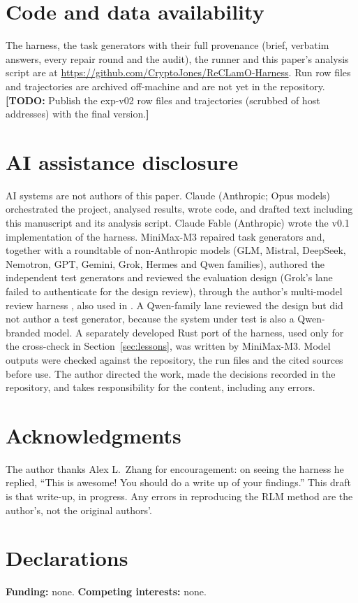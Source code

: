 \documentclass[11pt]{article}
\newcommand{\TODO}[1]{\textcolor{red!70!black}{\textbf{[TODO:} #1\textbf{]}}}
\begin{document}
\section*{Code and data availability}
The harness, the task generators with their full provenance (brief, verbatim
answers, every repair round and the audit), the runner and this paper's analysis
script are at \url{https://github.com/CryptoJones/ReCLamO-Harness}. Run row files and
trajectories are archived off-machine and are not yet in the repository.
\TODO{Publish the exp-v02 row files and trajectories (scrubbed of host addresses)
with the final version.}

\section*{AI assistance disclosure}
\label{sec:disclosure}
AI systems are not authors of this paper. Claude (Anthropic; Opus models)
orchestrated the project, analysed results, wrote code, and drafted text including
this manuscript and its analysis script. Claude Fable (Anthropic) wrote the v0.1
implementation of the harness. MiniMax-M3 repaired task generators and, together
with a roundtable of non-Anthropic models (GLM, Mistral, DeepSeek, Nemotron, GPT,
Gemini, Grok, Hermes and Qwen families), authored the independent test generators and
reviewed the evaluation design (Grok's lane failed to authenticate for the design
review), through the author's multi-model review harness
\citep{flatline}, also used in \citet{clark2026veto}. A Qwen-family lane reviewed the
design but did not author a test generator, because the system under test is also a Qwen-branded model. A separately developed Rust port of the harness, used only for the
cross-check in Section~\ref{sec:lessons}, was written by MiniMax-M3. Model outputs were checked against the repository, the run files and the cited
sources before use. The author directed the work, made the decisions recorded in the
repository, and takes responsibility for the content, including any errors.

\section*{Acknowledgments}
The author thanks Alex L.\ Zhang for encouragement: on seeing the harness he replied,
``This is awesome! You should do a write up of your findings.'' This draft is that
write-up, in progress. Any errors in reproducing the RLM method are the author's,
not the original authors'.

\section*{Declarations}
\noindent\textbf{Funding:} none. \quad \textbf{Competing interests:} none.



\end{document}
